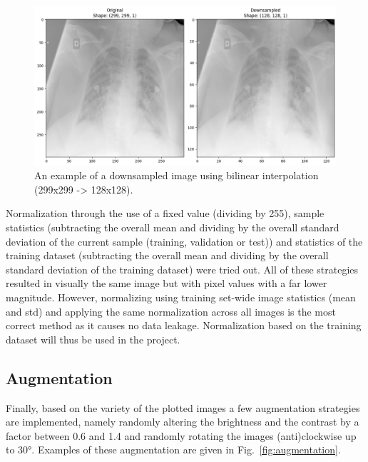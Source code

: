 \documentclass[conference]{IEEEtran}
\begin{document}
\begin{figure}[htbp]
\centerline{\includegraphics[width=\linewidth]{Images/downsample.png}}
\caption{An example of a downsampled image using bilinear interpolation (299x299 -> 128x128).}
\label{fig:downsample}
\end{figure}

Normalization through the use of a fixed value (dividing by 255), sample statistics (subtracting the overall mean and dividing by the overall standard deviation of the current sample (training, validation or test)) and statistics of the training dataset (subtracting the overall mean and dividing by the overall standard deviation of the training dataset) were tried out. All of these strategies resulted in visually the same image but with pixel values with a far lower magnitude. However, normalizing using training set-wide image statistics (mean and std) and applying the same normalization across all images is the most correct method as it causes no data leakage. Normalization based on the training dataset will thus be used in the project.  

\subsection{Augmentation}
Finally, based on the variety of the plotted images a few augmentation strategies are implemented, namely randomly altering the brightness and the contrast by a factor between 0.6 and 1.4 and randomly rotating the images (anti)clockwise up to 30°. Examples of these augmentation are given in Fig.~\ref{fig:augmentation}.
\end{document}
